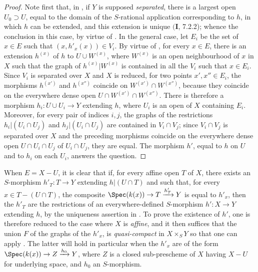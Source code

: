 \begin{proof}
Note first that, in , if $Y$ is supposed \emph{separated}, there is a largest open $U_0\supset U$, equal to the domain of the $S$-rational application corresponding to $h$, in which $h$ can be extended, and this extension is unique $(\mathbf{I}$, 7.2.2);
whence the conclusion in this case, by virtue of .
In the general case, let $E_i$ be the set of $x\in E$ such that $(x,h'_x(x))\in V_i$.
By virtue of , for every $x\in E$, there is an extension $h^{(x)}$ of $h$ to $U\cup W^{(x)}$, where $W^{(x)}$ is an open neighbourhood of $x$ in $X$ such that the graph of $h^{(x)}|W^{(x)}$ is contained in all the $V_i$ such that $x\in E_i$.
Since $V_i$ is separated over $X$ and $X$ is reduced, for two points $x',x''\in E_i$, the morphisms $h^{(x')}$ and $h^{(x'')}$ coincide on $W^{(x')}\cap W^{(x'')}$, because they
coincide on the everywhere dense open $U\cap W^{(x')}\cap W^{(x'')}$.
There is therefore a morphism $h_i:U\cup U_i\to Y$ extending $h$, where $U_i$ is an open of $X$ containing $E_i$.
Moreover, for every pair of indices $i,j$, the graphs of the restrictions $h_i|(U_i\cap U_j)$ and $h_j|(U_i\cap U_j)$ are contained in $V_i\cap V_j$;
since $V_i\cap V_j$ is separated over $X$ and the preceding morphisms coincide on the everywhere dense open $U\cap U_i\cap U_j$ of $U_i\cap U_j$, they are equal.
The morphism $h'$, equal to $h$ on $U$ and to $h_i$ on each $U_i$, answers the question.
\end{proof}

\begin{remark}[20.4.8]
\label{IV.20.4.8}
When $E=X-U$, it is clear that if, for every affine open $T$ of $X$, there exists an $S$-morphism $h'_T:T\to Y$ extending $h|(U\cap T)$ and such that, for every $x\in T-(U\cap T)$, the composite $\Spec(k(x))\to T\xrightarrow{h'_T}Y$ is equal to $h'_x$, then the $h'_T$ are the restrictions of an everywhere-defined $S$-morphism $h':X\to Y$ extending $h$, by the uniqueness assertion in .
To prove the existence of $h'$, one is therefore reduced to the case where $X$ is \emph{affine}, and it then suffices that the union $F$ of the graphs of the $h'_x$, is \emph{quasi-compact} in $X\times_S Y$ so that one can apply .
The latter will hold in particular when the $h'_x$ are of the form $\Spec(k(x))\to Z\xrightarrow{h_0}Y$, where $Z$ is a closed sub-prescheme of $X$ having $X-U$ for underlying space, and $h_0$ an $S$-morphism.
\end{remark}

